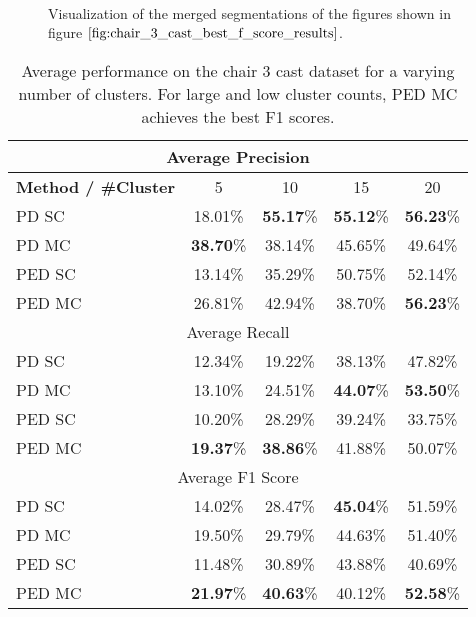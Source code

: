 %
\begin{figure}[H]
\begin{center}

~
\end{center}
\caption[Chair 3 Cast Winner]{Visualization of the merged segmentations of the figures shown in figure $\ref{fig:chair_3_cast_best_f_score_results}$.}
\label{fig:chair_3_cast_best_f_score_results_merged}
\end{figure}

\begin{table}[H]
\centering
\begin{tabular}{|l|c|c|c|c|}
\hline
\multicolumn{5}{|c|}{Average Precision} \\ \hline
\textbf{Method / \#Cluster} & 5 & 10 & 15 & 20 \\ \hline
PD SC & 18.01\% & \textbf{55.17}\% & \textbf{55.12}\% & \textbf{56.23}\% \\ \hline
PD MC & \textbf{38.70}\% & 38.14\% & 45.65\% & 49.64\% \\ \hline
PED SC & 13.14\% & 35.29\% & 50.75\% & 52.14\%  \\ \hline
PED MC & 26.81\% & 42.94\% & 38.70\% & \textbf{56.23}\% \\ \hline
\multicolumn{5}{|c|}{Average Recall} \\ \hline
PD SC & 12.34\% & 19.22\% & 38.13\% & 47.82\% \\ \hline
PD MC & 13.10\% & 24.51\% & \textbf{44.07}\% & \textbf{53.50}\% \\ \hline
PED SC & 10.20\% & 28.29\% & 39.24\% & 33.75\% \\ \hline
PED MC & \textbf{19.37}\% & \textbf{38.86}\% & 41.88\% & 50.07\% \\ \hline
\multicolumn{5}{|c|}{Average F1 Score} \\ \hline
PD SC & 14.02\% & 28.47\% & \textbf{45.04}\% & 51.59\% \\ \hline
PD MC & 19.50\% & 29.79\% & 44.63\% & 51.40\% \\ \hline
PED SC & 11.48\% & 30.89\% & 43.88\% & 40.69\% \\ \hline
PED MC & \textbf{21.97}\% & \textbf{40.63}\% & 40.12\% & \textbf{52.58}\% \\ \hline
\end{tabular}
\caption[Chair 3 Cast: Average Precision Scores]{Average performance on the chair 3 cast dataset for a varying number of clusters. For large and low cluster counts, PED MC achieves the best F1 scores.}
\label{tab:chair_3_cast_avg_performance}
\end{table}

